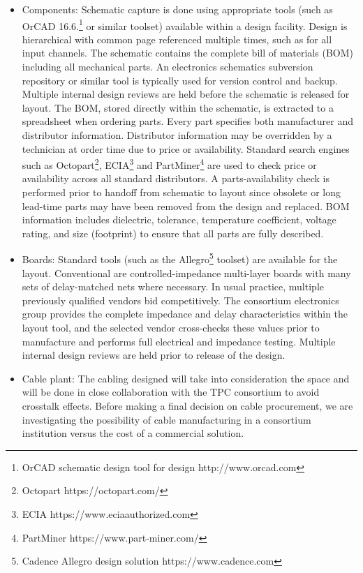 \begin{itemize}

\item Components: Schematic capture is done using appropriate tools (such as OrCAD 16.6.\footnote{OrCAD\texttrademark{} schematic design tool for  design http://www.orcad.com} or similar toolset) available within a design facility. Design is hierarchical with common  page referenced multiple times, such as for all input channels. 
The schematic contains the complete bill of materials (BOM) including all mechanical parts. An electronics schematics subversion
repository or similar tool is typically used for version control and backup. Multiple internal design reviews are held before the schematic is released %
for layout. The BOM, stored directly within the schematic, is extracted to a spreadsheet when ordering parts. Every part specifies %
both manufacturer and distributor information. Distributor information may be overridden by a technician at order time due to price or availability. Standard search engines such as Octopart\footnote{Octopart https://octopart.com/}, ECIA\footnote{ ECIA https://www.eciaauthorized.com} and PartMiner\footnote{PartMiner https://www.part-miner.com/} are used to check price or availability across all standard distributors. A parts-availability check %
is performed prior to handoff from schematic to layout since %
obsolete or long lead-time parts %
may have been removed from the design and replaced. BOM information includes dielectric, tolerance, temperature coefficient, voltage rating, and size (footprint) to ensure that all parts are fully described.

\item Boards: Standard tools (such as the Allegro\footnote{Cadence Allegro\textregistered {} design solution https://www.cadence.com} toolset) are available for the  layout. Conventional  are 
controlled-impedance multi-layer boards with many sets of delay-matched nets where necessary.
In usual practice, multiple previously qualified vendors bid competitively. The consortium electronics group provides the complete impedance and delay characteristics  within the layout tool, and the selected vendor cross-checks these values prior to manufacture and performs full electrical and impedance testing.  Multiple internal design reviews are held prior to release of the design.

\item Cable plant: The cabling designed will take into consideration the  space and will be done in close collaboration with the TPC  consortium to avoid crosstalk effects.  
Before making a final decision on cable procurement, we are investigating the possibility of cable manufacturing in a  consortium institution versus the cost of a commercial solution.  


\end{itemize}
